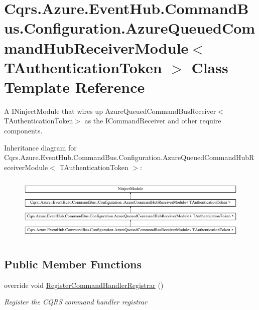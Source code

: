 \hypertarget{classCqrs_1_1Azure_1_1EventHub_1_1CommandBus_1_1Configuration_1_1AzureQueuedCommandHubReceiverModule}{}\section{Cqrs.\+Azure.\+Event\+Hub.\+Command\+Bus.\+Configuration.\+Azure\+Queued\+Command\+Hub\+Receiver\+Module$<$ T\+Authentication\+Token $>$ Class Template Reference}
\label{classCqrs_1_1Azure_1_1EventHub_1_1CommandBus_1_1Configuration_1_1AzureQueuedCommandHubReceiverModule}


A I\+Ninject\+Module that wires up Azure\+Queued\+Command\+Bus\+Receiver$<$\+T\+Authentication\+Token$>$ as the I\+Command\+Receiver and other require components.  


Inheritance diagram for Cqrs.\+Azure.\+Event\+Hub.\+Command\+Bus.\+Configuration.\+Azure\+Queued\+Command\+Hub\+Receiver\+Module$<$ T\+Authentication\+Token $>$\+:\begin{figure}[H]
\begin{center}
\leavevmode
\includegraphics[height=3.190883cm]{classCqrs_1_1Azure_1_1EventHub_1_1CommandBus_1_1Configuration_1_1AzureQueuedCommandHubReceiverModule}
\end{center}
\end{figure}
\subsection*{Public Member Functions}
\begin{DoxyCompactItemize}
\item 
override void \hyperlink{classCqrs_1_1Azure_1_1EventHub_1_1CommandBus_1_1Configuration_1_1AzureQueuedCommandHubReceiverModule_a2513051554179e7d2a4d800375300b53_a2513051554179e7d2a4d800375300b53}{Register\+Command\+Handler\+Registrar} ()
\begin{DoxyCompactList}\small\item\em Register the C\+Q\+RS command handler registrar \end{DoxyCompactList}\end{DoxyCompactItemize}


